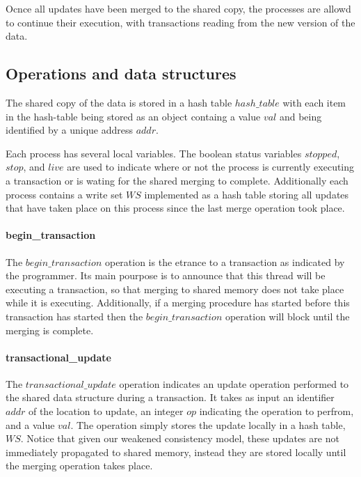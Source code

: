 \documentclass[11pt,letterpaper]{article}
\begin{document}
Ocnce all updates have been merged to the shared copy, the processes are allowd to continue their execution,
with transactions reading from the new version of the data.


\subsection{Operations and data structures}

The shared copy of the data is stored in a hash table
$\mathit{hash\_table}$ with each item in the hash-table
being stored as an object
containg a value $\mathit{val}$ and
being identified by a unique address $\mathit{addr}$.

Each process has several local variables.
The boolean status variables $\mathit{stopped}$,
$\mathit{stop}$, and $\mathit{live}$ are used to indicate
where or not the process is currently executing a transaction
or is wating for the shared merging to complete.
Additionally each process contains a write set $\mathit{WS}$
implemented as a hash table
storing all updates that have taken place on this process
since the last merge operation took place.

\paragraph{begin\_transaction}
The $\mathit{begin\_transaction}$ operation is the etrance to
a transaction as indicated by the programmer.
Its main pourpose is to announce that this thread will be executing
a transaction, so that merging to shared memory does not take place
while it is executing.
Additionally, if a merging procedure has started before this transaction
has started then the $\mathit{begin\_transaction}$ operation will
block until the merging is complete.




\paragraph{transactional\_update}
The $\mathit{transactional\_update}$ operation indicates an update operation
performed to the shared data structure during a transaction.
It takes as input an identifier $\mathit{addr}$ of the location to update,
an integer $\mathit{op}$ indicating the operation to perfrom, and a value $\mathit{val}$.
The operation simply stores the update locally in a hash table, $\mathit{WS}$.
Notice that given our weakened consistency model, these updates are not
immediately propagated to shared memory, instead
they are stored locally until the merging operation takes place.
\end{document}
